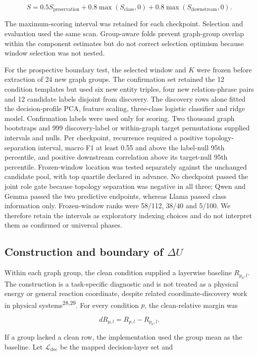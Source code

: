 \documentclass[12pt]{article}
\begin{document}
\[
S=0.5S_{\mathrm{preservation}}+0.8\max(S_{\mathrm{class}},0)+0.8\max(S_{\mathrm{downstream}},0).
\]

The maximum-scoring interval was retained for each checkpoint. Selection and evaluation used the same scan. Group-aware folds prevent graph-group overlap within the component estimates but do not correct selection optimism because window selection was not nested.

For the prospective boundary test, the selected window and \(K\) were frozen before extraction of 24 new graph groups. The confirmation set retained the 12 condition templates but used six new entity triples, four new relation-phrase pairs and 12 candidate labels disjoint from discovery. The discovery rows alone fitted the decision-profile PCA, feature scaling, three-class logistic classifier and ridge model. Confirmation labels were used only for scoring. Two thousand graph bootstraps and 999 discovery-label or within-graph target permutations supplied intervals and nulls. Per checkpoint, recurrence required a positive topology-separation interval, macro F1 at least 0.55 and above the label-null 95th percentile, and positive downstream correlation above its target-null 95th percentile. Frozen-window location was tested separately against the unchanged candidate pool, with top quartile declared in advance. No checkpoint passed the joint role gate because topology separation was negative in all three; Qwen and Gemma passed the two predictive endpoints, whereas Llama passed class information only. Frozen-window ranks were 58/112, 38/40 and 5/100. We therefore retain the intervals as exploratory indexing choices and do not interpret them as confirmed or universal phases.

\subsection*{Construction and boundary of \(\Delta U\)}

Within each graph group, the clean condition supplied a layerwise baseline \(R_{p_0,l}\). The construction is a task-specific diagnostic and is not treated as a physical energy or general reaction coordinate, despite related coordinate-discovery work in physical systems\textsuperscript{28,29}. For every condition \(p\), the clean-relative margin was

\[
dR_{p,l}=R_{p,l}-R_{p_0,l}.
\]

If a group lacked a clean row, the implementation used the group mean as the baseline. Let \(\mathcal{L}_{\mathrm{dec}}\) be the mapped decision-layer set and
\end{document}

